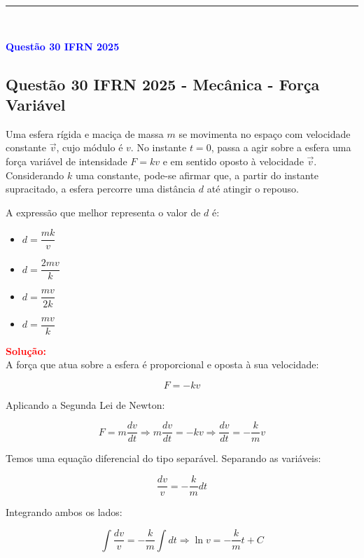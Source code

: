 \noindent\rule{\linewidth}{0.6pt}\\


\begin{flushleft}
\textbf{\textcolor{blue}{\Large Quest\~ao 30 IFRN 2025}}\\
\noindent
\subsection{Quest\~ao 30 IFRN 2025 - Mecânica - For\c{c}a Vari\'avel}

Uma esfera r\'igida e maci\c{c}a de massa \( m \) se movimenta no espa\c{c}o com 
velocidade constante \( \vec{v} \), cujo m\'odulo \'e \( v \). No instante \( t = 0 \), 
passa a agir sobre a esfera uma for\c{c}a vari\'avel de intensidade \( F = kv \) e em 
sentido oposto \`a velocidade \( \vec{v} \). Considerando \( k \) uma constante, 
pode-se afirmar que, a partir do instante supracitado, a esfera percorre uma dist\^ancia 
\( d \) at\'e atingir o repouso.

A express\~ao que melhor representa o valor de \( d \) \'e:

\begin{itemize}
    \item[(A)] \( d = \dfrac{mk}{v} \)
    \item[(B)] \( d = \dfrac{2mv}{k} \)
    \item[(C)] \( d = \dfrac{mv}{2k} \)
    \item[(D)] \( d = \dfrac{mv}{k} \)
\end{itemize}

\vspace{0.5cm}

\textcolor{red}{\textbf{Solução:}}\\

A for\c{c}a que atua sobre a esfera \'e proporcional e oposta \`a sua velocidade:

\[
F = -kv
\]

Aplicando a Segunda Lei de Newton:

\[
F = m \frac{dv}{dt} \Rightarrow m \frac{dv}{dt} = -kv
\Rightarrow \frac{dv}{dt} = -\frac{k}{m} v
\]

Temos uma equa\c{c}\~ao diferencial do tipo separ\'avel. Separando as vari\'aveis:

\[
\frac{dv}{v} = -\frac{k}{m} dt
\]

Integrando ambos os lados:

\[
\int \frac{dv}{v} = -\frac{k}{m} \int dt
\Rightarrow \ln v = -\frac{k}{m}t + C
\]


\end{flushleft}
